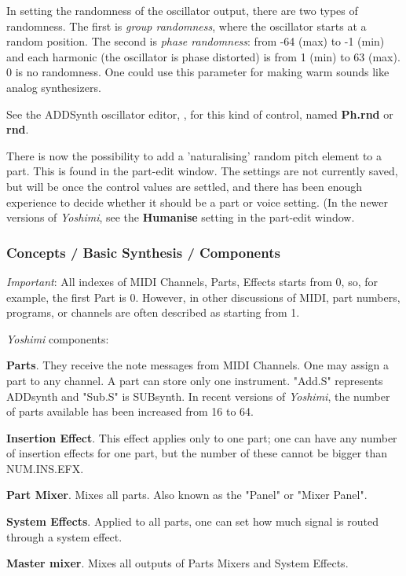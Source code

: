    In setting the randomness of the oscillator output, there are two types of
   randomness. The first is \textsl{group randomness}, where the oscillator
   starts at a random position. The second is \textsl{phase randomness}:
   from -64 (max) to -1 (min) and each harmonic (the oscillator is phase
   distorted) is from 1 (min) to 63 (max). 0 is no randomness. One
   could use this parameter for making warm sounds like analog
   synthesizers.

   See the ADDSynth oscillator editor,
   ,
   for this kind of control, named \textbf{Ph.rnd} or \textbf{rnd}.

   There is now the possibility to add a 'naturalising' random pitch element
   to a part. This is found in the part-edit window. The settings are not
   currently saved, but will be once the control values are settled, and
   there has been enough experience to decide whether it should be a part or
   voice setting.  (In the newer versions of \textsl{Yoshimi}, see the
   \textbf{Humanise} setting in the part-edit window.

\subsubsection{Concepts / Basic Synthesis / Components}
\label{subsubsec:concepts_basics_components}

   \textsl{Important}:
   All indexes of MIDI Channels, Parts, Effects starts from 0, so, for
   example, the first Part is 0.  However, in other discussions of MIDI,
   part numbers, programs, or channels are often described as starting from 1.

   \textsl{Yoshimi} components:

   \begin{enumber}
      \item \textbf{Parts}.
         They receive the note messages from MIDI
         Channels. One may assign a part to any channel. A part can store
         only one instrument.  "Add.S" represents ADDsynth and "Sub.S" is
         SUBsynth.  In recent versions of \textsl{Yoshimi}, the number of
         parts available has been increased from 16 to 64.
      \item \textbf{Insertion Effect}.
         This effect applies only to one part; one can have any number of
         insertion effects for one part, but the number of these cannot be
         bigger than NUM.INS.EFX.
      \item \textbf{Part Mixer}.
         Mixes all parts.  Also known as the "Panel" or "Mixer Panel".
      \item \textbf{System Effects}.
         Applied to all parts, one can set how much signal
         is routed through a system effect.
      \item \textbf{Master mixer}.
         Mixes all outputs of Parts Mixers and System Effects.
   \end{enumber}

